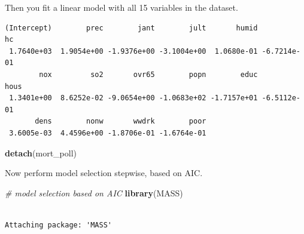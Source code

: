 \documentclass[
]{book}
\newenvironment{Shaded}{\begin{snugshade}}{\end{snugshade}}
\newcommand{\CommentTok}[1]{\textcolor[rgb]{0.56,0.35,0.01}{\textit{#1}}}
\newcommand{\KeywordTok}[1]{\textcolor[rgb]{0.13,0.29,0.53}{\textbf{#1}}}
\newcommand{\NormalTok}[1]{#1}
\newcommand{\OperatorTok}[1]{\textcolor[rgb]{0.81,0.36,0.00}{\textbf{#1}}}
\newcommand{\StringTok}[1]{\textcolor[rgb]{0.31,0.60,0.02}{#1}}
\begin{document}
Then you fit a linear model with all 15 variables in the dataset.

\begin{Shaded}
\end{Shaded}

\begin{verbatim}
(Intercept)        prec        jant        jult       humid          hc 
 1.7640e+03  1.9054e+00 -1.9376e+00 -3.1004e+00  1.0680e-01 -6.7214e-01 
        nox         so2       ovr65        popn        educ        hous 
 1.3401e+00  8.6252e-02 -9.0654e+00 -1.0683e+02 -1.7157e+01 -6.5112e-01 
       dens        nonw       wwdrk        poor 
 3.6005e-03  4.4596e+00 -1.8706e-01 -1.6764e-01 
\end{verbatim}

\begin{Shaded}
\begin{Highlighting}[]
\KeywordTok{detach}\NormalTok{(mort_poll)}
\end{Highlighting}
\end{Shaded}

Now perform model selection stepwise, based on AIC.

\begin{Shaded}
\begin{Highlighting}[]
\CommentTok{# model selection based on AIC}
\KeywordTok{library}\NormalTok{(MASS)}
\end{Highlighting}
\end{Shaded}

\begin{verbatim}

Attaching package: 'MASS'
\end{verbatim}
\end{document}
